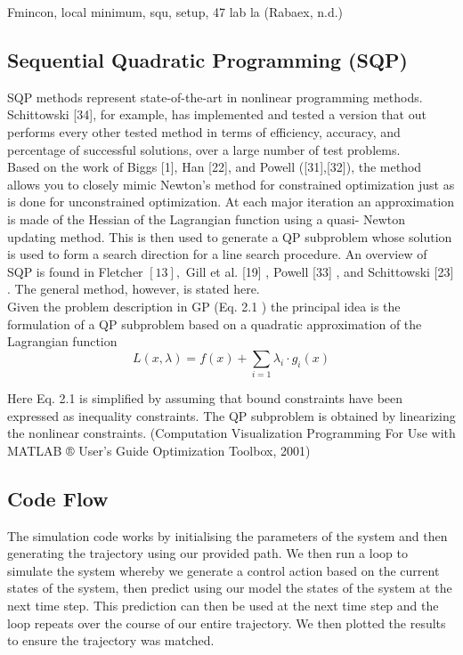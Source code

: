 \documentclass{UoNMCHA}
\numberwithin{equation}{section}
\begin{document}
Fmincon, local minimum, squ, setup, 47 lab la (Rabaex, n.d.)

\subsection{Sequential Quadratic Programming (SQP)}

SQP methods represent state-of-the-art in nonlinear programming methods. Schittowski [34], for
example, has implemented and tested a version that out performs every other tested method in terms of
efficiency, accuracy, and percentage of successful solutions, over a large number of test problems.\\
Based on the work of Biggs [1], Han [22], and Powell ([31],[32]), the method allows you to closely
mimic Newton's method for constrained optimization just as is done for unconstrained optimization. At
each major iteration an approximation is made of the Hessian of the Lagrangian function using a quasi-
Newton updating method. This is then used to generate a QP subproblem whose solution is used to
form a search direction for a line search procedure. An overview of SQP is found in Fletcher $[13],$ Gill
et al. [19] , Powell [33] , and Schittowski [23] . The general method, however, is stated here.\\

Given the problem description in GP (Eq. 2.1 ) the principal idea is the formulation of a QP subproblem
based on a quadratic approximation of the Lagrangian function
$$
L(x, \lambda)=f(x)+\sum_{i=1} \lambda_{i} \cdot g_{i}(x)
$$

Here Eq. 2.1 is simplified by assuming that bound constraints have been expressed as inequality constraints. The QP subproblem is obtained by linearizing the nonlinear constraints.  (Computation Visualization Programming For Use with MATLAB ® User’s Guide Optimization Toolbox, 2001) \\

\subsection*{Code Flow}
The simulation code works by initialising the parameters of the system and then generating the trajectory using our provided path. We then run a loop to simulate the system whereby we generate a control action based on the current states of the system, then predict using our model the states of the system at the next time step. This prediction can then be used at the next time step and the loop repeats over the course of our entire trajectory. 
We then plotted the results to ensure the trajectory was matched.
  
\end{document}
